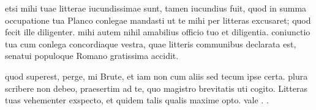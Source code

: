 


 etsi mihi tuae litterae iucundissimae sunt, tamen iucundius fuit, quod in summa occupatione tua Planco conlegae mandasti ut te mihi per litteras excusaret; quod fecit ille diligenter. mihi autem nihil amabilius officio tuo et diligentia. coniunctio tua cum conlega concordiaque vestra, quae litteris communibus declarata est, senatui populoque Romano gratissima accidit.

 quod superest, perge, mi Brute, et iam non cum aliis sed tecum ipse certa. plura scribere non debeo, praesertim ad te, quo magistro brevitatis uti cogito. Litteras tuas vehementer exspecto, et quidem talis qualis maxime opto. vale . .
